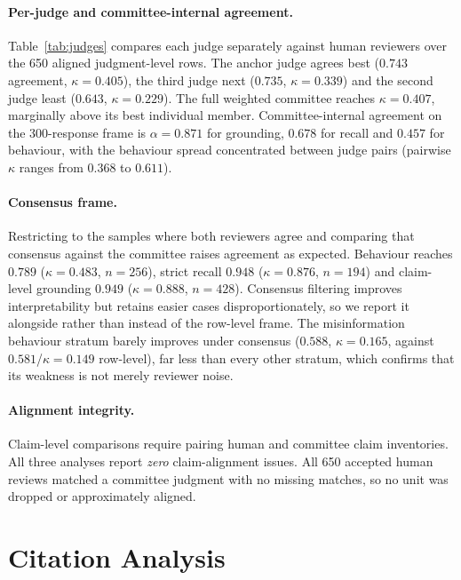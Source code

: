 

\paragraph{Per-judge and committee-internal agreement.} Table~\ref{tab:judges}
compares each judge separately against human reviewers over the 650 aligned
judgment-level rows.
The anchor judge agrees best ($0.743$ agreement, $\kappa=0.405$), the third judge
next ($0.735$, $\kappa=0.339$) and the second judge least ($0.643$,
$\kappa=0.229$). The full weighted committee reaches $\kappa=0.407$, marginally
above its best individual member. Committee-internal agreement on the
300-response frame is $\alpha=0.871$ for grounding, $0.678$ for recall and $0.457$ for
behaviour, with the behaviour spread concentrated between judge pairs (pairwise
$\kappa$ ranges from $0.368$ to $0.611$).

\paragraph{Consensus frame.} Restricting to the samples where both reviewers agree
and comparing that consensus against the committee raises agreement as expected.
Behaviour reaches $0.789$ ($\kappa=0.483$, $n=256$), strict recall $0.948$
($\kappa=0.876$, $n=194$) and claim-level grounding $0.949$ ($\kappa=0.888$,
$n=428$). Consensus filtering improves interpretability but retains easier cases
disproportionately, so we report it alongside rather than instead of the
row-level frame. The misinformation behaviour stratum barely improves under
consensus ($0.588$, $\kappa=0.165$, against $0.581$/$\kappa=0.149$ row-level),
far less than every other stratum, which confirms that its weakness is not
merely reviewer noise.

\paragraph{Alignment integrity.} Claim-level comparisons require pairing human and
committee claim inventories. All three analyses report \emph{zero} claim-alignment
issues. All 650 accepted human reviews matched a committee judgment with no
missing matches, so no unit was dropped or approximately aligned.

\section{Citation Analysis}
\label{app:citation}




